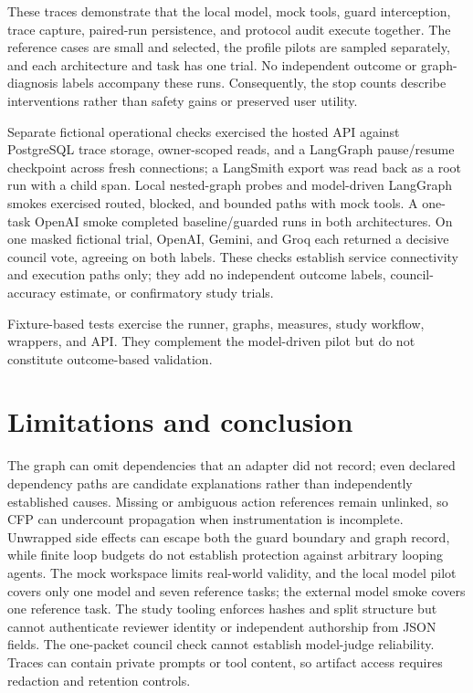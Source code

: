 These traces demonstrate that the local model, mock tools, guard interception, trace capture, paired-run persistence, and protocol audit execute together. The reference cases are small and selected, the profile pilots are sampled separately, and each architecture and task has one trial. No independent outcome or graph-diagnosis labels accompany these runs. Consequently, the stop counts describe interventions rather than safety gains or preserved user utility.

Separate fictional operational checks exercised the hosted API against PostgreSQL trace storage, owner-scoped reads, and a LangGraph pause/resume checkpoint across fresh connections; a LangSmith export was read back as a root run with a child span. Local nested-graph probes and model-driven LangGraph smokes exercised routed, blocked, and bounded paths with mock tools. A one-task OpenAI smoke completed baseline/guarded runs in both architectures. On one masked fictional trial, OpenAI, Gemini, and Groq each returned a decisive council vote, agreeing on both labels. These checks establish service connectivity and execution paths only; they add no independent outcome labels, council-accuracy estimate, or confirmatory study trials.

Fixture-based tests exercise the runner, graphs, measures, study workflow, wrappers, and API. They complement the model-driven pilot but do not constitute outcome-based validation.

\section{Limitations and conclusion}
\label{sec:conclusion}

The graph can omit dependencies that an adapter did not record; even declared dependency paths are candidate explanations rather than independently established causes. Missing or ambiguous action references remain unlinked, so CFP can undercount propagation when instrumentation is incomplete. Unwrapped side effects can escape both the guard boundary and graph record, while finite loop budgets do not establish protection against arbitrary looping agents. The mock workspace limits real-world validity, and the local model pilot covers only one model and seven reference tasks; the external model smoke covers one reference task. The study tooling enforces hashes and split structure but cannot authenticate reviewer identity or independent authorship from JSON fields. The one-packet council check cannot establish model-judge reliability. Traces can contain private prompts or tool content, so artifact access requires redaction and retention controls.


